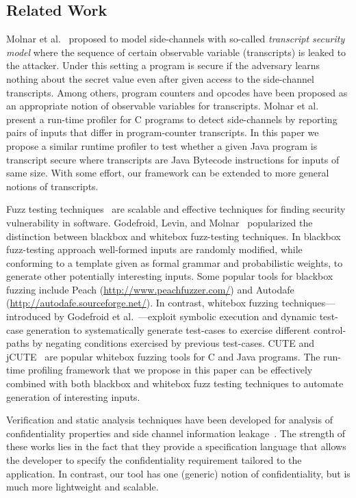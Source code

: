 \subsection{Related Work} 

Molnar et al.~\cite{Molnar05} proposed to model side-channels with
so-called \emph{transcript security model} where the sequence of certain
observable variable (transcripts) is leaked to the attacker.
Under this setting a program is secure if the adversary learns nothing about the
secret value even after given access to the side-channel transcripts.
Among others, program counters and opcodes have been proposed as an appropriate
notion of observable variables for transcripts.
Molnar et al.~\cite{Molnar05} present a run-time profiler for C programs to
detect side-channels by reporting pairs of inputs that differ in program-counter
transcripts.
In this paper we propose a similar runtime profiler to test whether a given
Java program is transcript secure where transcripts are Java Bytecode
instructions for inputs of same size.
With some effort, our framework can be extended to more general notions of
transcripts.

Fuzz testing techniques~\cite{God12} are scalable and effective techniques for finding security
vulnerability in software.
Godefroid, Levin, and Molnar~\cite{God12} popularized the distinction between
blackbox and whitebox fuzz-testing techniques.
In blackbox fuzz-testing approach well-formed inputs are randomly modified,
while conforming to a template given as formal grammar and probabilistic
weights, to generate other potentially interesting inputs.  
Some popular tools for blackbox fuzzing include Peach 
(\url{http://www.peachfuzzer.com/}) and Autodafe
(\url{http://autodafe.sourceforge.net/}).
In contrast, whitebox fuzzing techniques---introduced by Godefroid et
al.~\cite{God12,GKS05}---exploit symbolic execution and dynamic test-case generation
to systematically generate test-cases to exercise different control-paths by
negating conditions exercised by previous test-cases.
CUTE and jCUTE~\cite{Sen2006} are popular whitebox fuzzing tools for C and Java
programs. 
The run-time profiling framework that we propose in this paper can be
effectively combined with both blackbox and whitebox fuzz testing techniques to
automate generation of interesting inputs.

Verification and static analysis techniques have been developed for
analysis of confidentiality properties and side channel information
leakage~\cite{EWS14,KMO12,BSB07,BDG12,CA09}. The strength of these
works lies in the fact that they provide a specification language that
allows the developer to specify the confidentiality requirement
tailored to the application. In contrast, our tool has one
(generic) notion of confidentiality, but is much more lightweight and
scalable. 

